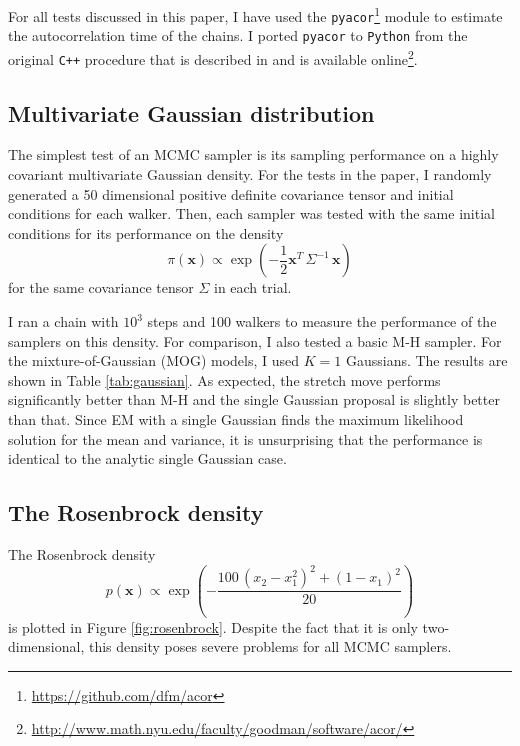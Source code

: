 \documentclass[12pt,preprint]{aastex}
\newcommand{\project}[1]{\texttt{#1}}
\newcommand{\fig}[1]{Figure \ref{fig:#1}}
\newcommand{\tab}[1]{Table \ref{tab:#1}}
\begin{document}
For all tests discussed in this paper, I have used the \project{pyacor}\footnote{\url{https://github.com/dfm/acor}}
module to estimate the autocorrelation time of the chains. I ported \project{pyacor} to \project{Python}
from the original \project{C++} procedure that is described in \citet{Goodman:2010} and
is available online\footnote{\url{http://www.math.nyu.edu/faculty/goodman/software/acor/}}.


\subsection{Multivariate Gaussian distribution}

The simplest test of an MCMC sampler is its sampling performance on a highly covariant
multivariate Gaussian density. For the tests in the paper, I randomly generated
a 50 dimensional positive definite covariance tensor and initial conditions for each
walker.  Then, each sampler was tested with the same initial conditions for its
performance on the density
\begin{equation}
    \pi (\mathbf{x}) \propto \exp\left ( -\frac{1}{2} \mathbf{x}^T \, \Sigma^{-1} \, \mathbf{x} \right )
\end{equation}
for the same covariance tensor $\Sigma$ in each trial.

I ran a chain with $10^3$ steps and 100 walkers to measure the performance of the
samplers on this density. For comparison, I also tested a basic M-H sampler. For
the mixture-of-Gaussian (MOG) models, I used $K = 1$ Gaussians. The
results are shown in \tab{gaussian}. As expected, the stretch move performs
significantly better than M-H and the single Gaussian proposal is slightly better
than that. Since EM with a single Gaussian finds the maximum likelihood solution
for the mean and variance, it is unsurprising that the performance is identical
to the analytic single Gaussian case.

\subsection{The Rosenbrock density}

The Rosenbrock density
\begin{equation}
    p(\mathbf{x}) \propto \exp \left ( -\frac{100 \, (x_2 - x_1^2)^2+ (1-x_1)^2}{20} \right )
\end{equation}
is plotted in \fig{rosenbrock}. Despite the fact that it is only two-dimensional,
this density poses severe problems for all MCMC samplers.
\end{document}

